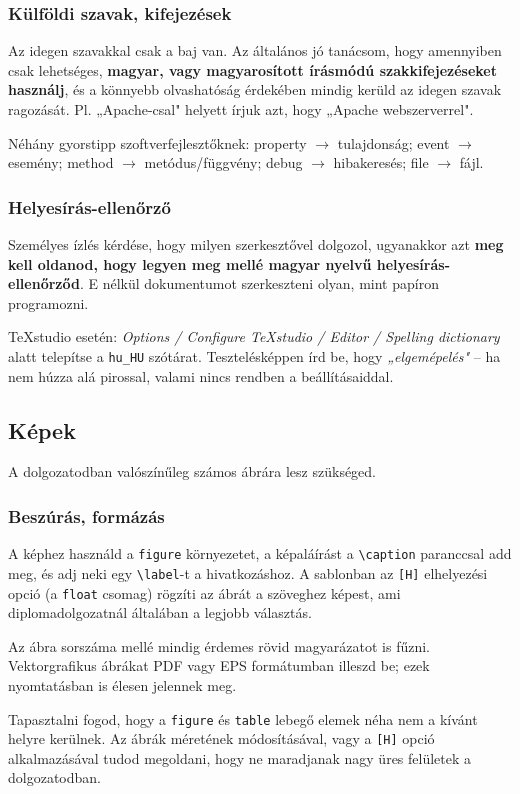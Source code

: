 \documentclass{sapientia-thesis}
\begin{document}
\subsubsection{Külföldi szavak, kifejezések}
Az idegen szavakkal csak a baj van. Az általános jó tanácsom, hogy amennyiben csak lehetséges, \textbf{magyar, vagy magyarosított írásmódú szakkifejezéseket használj}, és a könnyebb olvashatóság érdekében mindig kerüld az idegen szavak ragozását. Pl. „Apache-csal" helyett írjuk azt, hogy „Apache webszerverrel".

Néhány gyorstipp szoftverfejlesztőknek: property $\to$ tulajdonság; event $\to$ esemény; method $\to$ metódus/függvény; debug $\to$ hibakeresés; file $\to$ fájl.

\subsubsection{Helyesírás-ellenőrző}
Személyes ízlés kérdése, hogy milyen szerkesztővel dolgozol, ugyanakkor azt \textbf{meg kell oldanod, hogy legyen meg mellé magyar nyelvű helyesírás-ellenőrződ}. E nélkül dokumentumot szerkeszteni olyan, mint papíron programozni.

TeXstudio esetén: \textit{Options / Configure TeXstudio / Editor / Spelling dictionary} alatt telepítse a \texttt{hu\_HU} szótárat. Tesztelésképpen írd be, hogy \textit{„elgemépelés"} -- ha nem húzza alá pirossal, valami nincs rendben a beállításaiddal.

\subsection{Képek}
A dolgozatodban valószínűleg számos ábrára lesz szükséged.

\subsubsection{Beszúrás, formázás}
A képhez használd a \texttt{figure} környezetet, a képaláírást a \verb|\caption| paranccsal add meg, és adj neki egy \verb|\label|-t a hivatkozáshoz. A sablonban az \texttt{[H]} elhelyezési opció (a \texttt{float} csomag) rögzíti az ábrát a szöveghez képest, ami diplomadolgozatnál általában a legjobb választás.

Az ábra sorszáma mellé mindig érdemes rövid magyarázatot is fűzni. Vektorgrafikus ábrákat PDF vagy EPS formátumban illeszd be; ezek nyomtatásban is élesen jelennek meg.

Tapasztalni fogod, hogy a \texttt{figure} és \texttt{table} lebegő elemek néha nem a kívánt helyre kerülnek. Az ábrák méretének módosításával, vagy a \verb|[H]| opció alkalmazásával tudod megoldani, hogy ne maradjanak nagy üres felületek a dolgozatodban.
\end{document}

